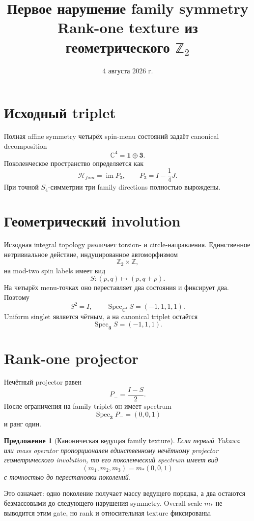 \documentclass[12pt,a4paper]{article}
\title{Первое нарушение family symmetry\\
Rank-one texture из геометрического \(\mathbb Z_2\)}
\author{}
\date{4 августа 2026 г.}
\newtheorem{proposition}{Предложение}
\begin{document}
\maketitle

\section{Исходный triplet}

Полная affine symmetry четырёх spin-menu состояний задаёт canonical decomposition
\[
\mathbb C^4=\mathbf1\oplus\mathbf3.
\]
Поколенческое пространство определяется как
\[
\mathcal H_{fam}=\operatorname{im}P_3,
\qquad
P_3=I-\frac14J.
\]
При точной \(S_4\)-симметрии три family directions полностью вырождены.

\section{Геометрический involution}

Исходная integral topology различает torsion- и circle-направления. Единственное нетривиальное действие, индуцированное автоморфизмом
\[
\mathbb Z_2\times\mathbb Z,
\]
на mod-two spin labels имеет вид
\[
S:(p,q)\longmapsto(p,q+p).
\]
На четырёх menu-точках оно переставляет два состояния и фиксирует два. Поэтому
\[
S^2=I,
\qquad
\operatorname{Spec}_{\mathbb C^4}S=(-1,1,1,1).
\]
Uniform singlet является чётным, а на canonical triplet остаётся
\[
\operatorname{Spec}_{\mathbf3}S=(-1,1,1).
\]

\section{Rank-one projector}

Нечётный projector равен
\[
P_- =\frac{I-S}{2}.
\]
После ограничения на family triplet он имеет spectrum
\[
\operatorname{Spec}_{\mathbf3}P_-=(0,0,1)
\]
и ранг один.

\begin{proposition}[Каноническая ведущая family texture]
Если первый Yukawa или mass operator пропорционален единственному нечётному projector геометрического involution, то его поколенческий spectrum имеет вид
\[
(m_1,m_2,m_3)=m_*(0,0,1)
\]
с точностью до перестановки поколений.
\end{proposition}

Это означает: одно поколение получает массу ведущего порядка, а два остаются безмассовыми до следующего нарушения symmetry. Overall scale \(m_*\) не выводится этим gate, но rank и относительная texture фиксированы.
\end{document}

